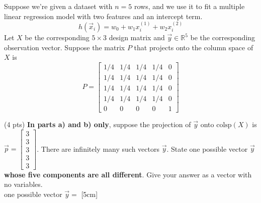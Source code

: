 \documentclass[11pt]{article}
\begin{document}
\newpage

\begin{prob}[(19 pts)]
Suppose we're given a dataset with $n = 5$ rows, and we use it to fit a multiple linear regression model with two features and an intercept term.
$$h(\vec x_i) = w_0 + w_1 x_i^{(1)} + w_2 x_i^{(2)}$$
Let $X$ be the corresponding $5 \times 3$ design matrix and $\vec y \in \mathbb{R}^5$ be the corresponding observation vector. Suppose the matrix $P$ that projects onto the column space of $X$ is
$$P = \begin{bmatrix} 1/4 & 1/4 & 1/4 & 1/4 & 0 \\ 1/4 & 1/4 & 1/4 & 1/4 & 0 \\ 1/4 & 1/4 & 1/4 & 1/4 & 0 \\ 1/4 & 1/4 & 1/4 & 1/4 & 0 \\ 0 & 0 & 0 & 0 & 1 \end{bmatrix}$$

\begin{subprob}(4 pts)
\textbf{In parts a) and b) only}, suppose the projection of $\vec y$ onto $\text{colsp}(X)$ is $\vec p = \begin{bmatrix} 3 \\ 3 \\ 3 \\ 3 \\ 3 \end{bmatrix}$. There are infinitely many such vectors $\vec y$. State one possible vector $\vec y$ \textbf{whose five components are all different}. Give your answer as a vector with no variables. \\

one possible vector $\vec y = $ [5cm]


\end{subprob}
\end{prob}
\end{document}
